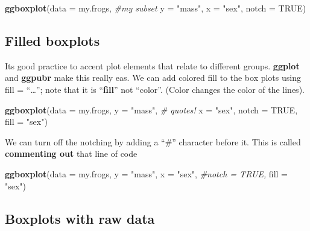 \documentclass[]{book}
\newenvironment{Shaded}{\begin{snugshade}}{\end{snugshade}}
\newcommand{\KeywordTok}[1]{\textcolor[rgb]{0.13,0.29,0.53}{\textbf{#1}}}
\newcommand{\DataTypeTok}[1]{\textcolor[rgb]{0.13,0.29,0.53}{#1}}
\newcommand{\StringTok}[1]{\textcolor[rgb]{0.31,0.60,0.02}{#1}}
\newcommand{\CommentTok}[1]{\textcolor[rgb]{0.56,0.35,0.01}{\textit{#1}}}
\newcommand{\OtherTok}[1]{\textcolor[rgb]{0.56,0.35,0.01}{#1}}
\newcommand{\NormalTok}[1]{#1}
\theoremstyle{definition}
\theoremstyle{definition}
\theoremstyle{definition}
\theoremstyle{remark}
\begin{document}
\begin{Shaded}
\begin{Highlighting}[]
\KeywordTok{ggboxplot}\NormalTok{(}\DataTypeTok{data =}\NormalTok{ my.frogs, }\CommentTok{#my subset}
          \DataTypeTok{y =} \StringTok{"mass"}\NormalTok{,}
          \DataTypeTok{x =} \StringTok{"sex"}\NormalTok{,}
          \DataTypeTok{notch  =} \OtherTok{TRUE}\NormalTok{)}
\end{Highlighting}
\end{Shaded}

\subsection{Filled boxplots}\label{filled-boxplots}

Its good practice to accent plot elements that relate to different
groups. \textbf{ggplot} and \textbf{ggpubr} make this really eas. We can
add colored fill to the box plots using fill = ``\ldots{}''; note that
it is ``\textbf{fill}'' not ``color''. (Color changes the color of the
lines).

\begin{Shaded}
\begin{Highlighting}[]
\KeywordTok{ggboxplot}\NormalTok{(}\DataTypeTok{data =}\NormalTok{ my.frogs,}
          \DataTypeTok{y =} \StringTok{"mass"}\NormalTok{,      }\CommentTok{# quotes!}
          \DataTypeTok{x =} \StringTok{"sex"}\NormalTok{,}
          \DataTypeTok{notch  =} \OtherTok{TRUE}\NormalTok{,}
          \DataTypeTok{fill =} \StringTok{"sex"}\NormalTok{)}
\end{Highlighting}
\end{Shaded}

We can turn off the notching by adding a ``\#'' character before it.
This is called \textbf{commenting out} that line of code

\begin{Shaded}
\begin{Highlighting}[]
\KeywordTok{ggboxplot}\NormalTok{(}\DataTypeTok{data =}\NormalTok{ my.frogs,}
          \DataTypeTok{y =} \StringTok{"mass"}\NormalTok{,}
          \DataTypeTok{x =} \StringTok{"sex"}\NormalTok{,}
          \CommentTok{#notch  = TRUE,}
          \DataTypeTok{fill =} \StringTok{"sex"}\NormalTok{)}
\end{Highlighting}
\end{Shaded}

\subsection{Boxplots with raw data}\label{boxplots-with-raw-data}
\end{document}
